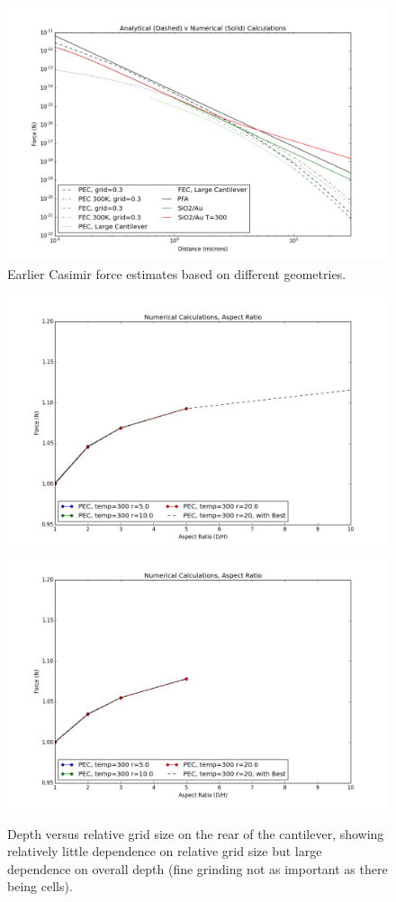 \documentclass[11pt,traditabstract]{article}
\begin{document}
\begin{figure}[h]
\centering
\includegraphics[width=7in]{analytic_v_numerical}
\caption{Earlier Casimir force estimates based on different geometries.}\label{fig:earlyEstimate}
\end{figure}

\begin{figure}[h]
\centering
\includegraphics[width=5.5in]{depth_v_gridding}
\includegraphics[width=5.5in]{depth_v_gridding_finite}
\caption{Depth versus relative grid size on the rear of the cantilever, showing relatively little dependence on relative grid size but large dependence on overall depth (fine grinding not as important as there being cells).}\label{fig:depth}
\end{figure}
\end{document}
